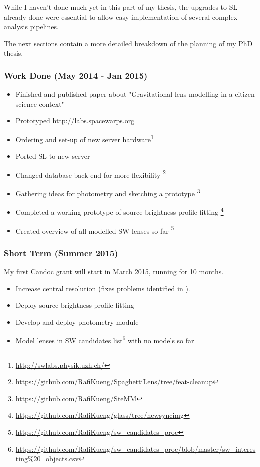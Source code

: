 \documentclass[11pt]{article}
\begin{document}
While I haven't done much yet in this part of my thesis, the upgrades to SL already done were essential to allow easy implementation of several complex analysis pipelines.


The next sections contain a more detailed breakdown of the planning of my PhD thesis.


\subsubsection{Work Done (May 2014 - Jan 2015)} \label{sec:plan_done}

\begin{itemize}
  \item Finished and published paper about "Gravitational lens modelling in a citizen science context" \cite{spaghetti}
  \item Prototyped \url{http://labs.spacewarps.org}
  \item Ordering and set-up of new server hardware\footnote{\url{http://swlabs.physik.uzh.ch/}}
  \item Ported SL to new server 
  \item Changed database back end for more flexibility \footnote{\url{https://github.com/RafiKueng/SpaghettiLens/tree/feat-cleanup}}
  \item Gathering ideas for photometry and sketching a prototype \footnote{\url{https://github.com/RafiKueng/SteMM}}
  \item Completed a working prototype of source brightness profile fitting \footnote{\url{https://github.com/RafiKueng/glass/tree/newsyncimg}}
  \item Created overview of all modelled SW lenses so far \footnote{\url{https://github.com/RafiKueng/sw_candidates_proc}}
\end{itemize}



\subsubsection{Short Term (Summer 2015)} \label{sec:plan_short}
My first Candoc grant will start in March 2015, running for 10 months.

\begin{itemize}
  \item Increase central resolution (fixes problems identified in \cite{spaghetti}).
  \item Deploy source brightness profile fitting
  \item Develop and deploy photometry module
  \item Model lenses in SW candidates list\footnote{\url{https://github.com/RafiKueng/sw_candidates_proc/blob/master/sw_interesting\%20_objects.csv}} with no models so far
\end{itemize}
\end{document}
